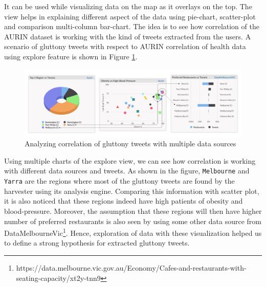 It can be used while visualizing data on the map as it overlays on the top. The view helps in explaining different aspect of the data using pie-chart, scatter-plot and comparison multi-column bar-chart. The idea is to see how correlation of the AURIN dataset is working with the kind of tweets extracted from the users. A scenario of gluttony tweets with respect to AURIN correlation of health data using explore feature is shown in Figure \ref{fig:exploreui2}.

\begin{figure}[H]
    \centering
    \includegraphics[width=16cm,keepaspectratio=true]{images/visualization_explore.png}
    \caption{Analyzing correlation of gluttony tweets with multiple data sources}
    \label{fig:exploreui2}
\end{figure}

Using multiple charts of the explore view, we can see how correlation is working with different data sources and tweets. As shown in the figure, \texttt{Melbourne} and \texttt{Yarra} are the regions where most of the gluttony tweets are found by the harvester using its analysis engine. Comparing this information with scatter plot, it is also noticed that these regions indeed have high patients of obesity and blood-pressure. Moreover, the assumption that these regions will then have higher number of preferred restaurants is also seen by using some other data source from DataMelbourneVic\footnote{https://data.melbourne.vic.gov.au/Economy/Cafes-and-restaurants-with-seating-capacity/xt2y-tnn9}. Hence, exploration of data with these visualization helped us to define a strong hypothesis for extracted gluttony tweets.
